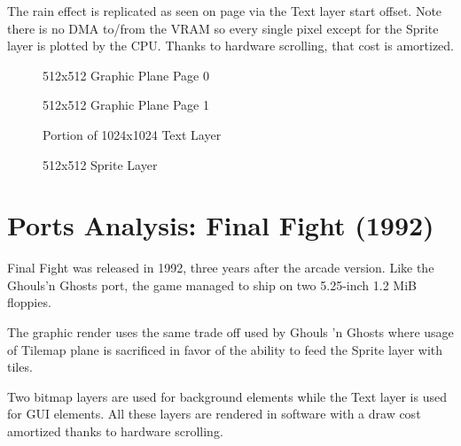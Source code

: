 The rain effect is replicated as seen on page \pageref{gg_rain} via the Text layer start offset. Note there is no DMA to/from the VRAM so every single pixel except for the Sprite layer is plotted by the CPU. Thanks to hardware scrolling, that cost is amortized.

\vspace{-4ex}
\begin{minipage}[t]{0.49\linewidth}
  \begin{figure}[H]
  \caption*{512x512 Graphic Plane Page 0}
  \end{figure}
\end{minipage}%
\hfill
\begin{minipage}[t]{0.49\linewidth}
  \begin{figure}[H]
  \caption*{512x512 Graphic Plane Page 1}
  \end{figure}
\end{minipage}%

\begin{minipage}[t]{0.49\linewidth}
  \begin{figure}[H]
  \caption*{Portion of 1024x1024 Text Layer}
  \end{figure}
\end{minipage}%
\hfill
\begin{minipage}[t]{0.49\linewidth}
   \begin{figure}[H]
  \caption*{512x512 Sprite Layer}
  \end{figure}
\end{minipage}%


\pagebreak

\section{Ports Analysis: Final Fight (1992)}

Final Fight was released in 1992, three years after the arcade version. Like the Ghouls'n Ghosts port, the game managed to ship on two 5.25-inch 1.2 MiB floppies.

The graphic render uses the same trade off used by Ghouls 'n Ghosts where usage of Tilemap plane is sacrificed in favor of the ability to feed the Sprite layer with tiles. 

Two bitmap layers are used for background elements while the Text layer is used for GUI elements. All these layers are rendered in software with a draw cost amortized thanks to hardware scrolling.

